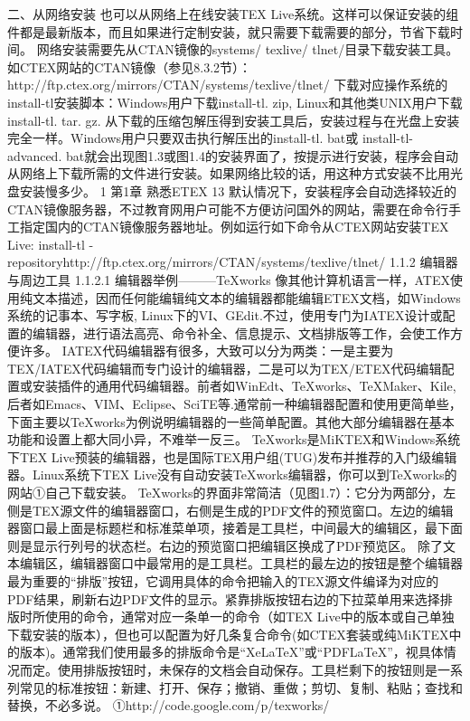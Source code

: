 \documentclass[UTF8]{ctexart}
\begin{document}
二、从网络安装
也可以从网络上在线安装TEX Live系统。这样可以保证安装的组件都是最新版本，而且如果进行定制安装，就只需要下载需要的部分，节省下载时间。
网络安装需要先从CTAN镜像的systems/ texlive/ tlnet/目录下载安装工具。如CTEX网站的CTAN镜像（参见8.3.2节）：
http://ftp.ctex.org/mirrors/CTAN/systems/texlive/tlnet/
下载对应操作系统的install-tl安装脚本：Windows用户下载install-tl. zip, Linux和其他类UNIX用户下载install-tl. tar. gz.
从下载的压缩包解压得到安装工具后，安装过程与在光盘上安装完全一样。Windows用户只要双击执行解压出的install-tl. bat或 install-tl-advanced. bat就会出现图1.3或图1.4的安装界面了，按提示进行安装，程序会自动从网络上下载所需的文件进行安装。如果网络比较的话，用这种方式安装不比用光盘安装慢多少。
1
第1章	熟悉ETEX	13
默认情况下，安装程序会自动选择较近的CTAN镜像服务器，不过教育网用户可能不方便访问国外的网站，需要在命令行手工指定国内的CTAN镜像服务器地址。例如运行如下命令从CTEX网站安装TEX Live:
install-tl -repositoryhttp://ftp.ctex.org/mirrors/CTAN/systems/texlive/tlnet/
1.1.2  编辑器与周边工具
1.1.2.1 编辑器举例———TeXworks
像其他计算机语言一样，ATEX使用纯文本描述，因而任何能编辑纯文本的编辑器都能编辑ETEX文档，如Windows系统的记事本、写字板, Linux下的VI、GEdit.不过，使用专门为IATEX设计或配置的编辑器，进行语法高亮、命令补全、信息提示、文档排版等工作，会使工作方便许多。
IATEX代码编辑器有很多，大致可以分为两类：一是主要为TEX/IATEX代码编辑而专门设计的编辑器，二是可以为TEX/ETEX代码编辑配置或安装插件的通用代码编辑器。前者如WinEdt、TeXworks、TeXMaker、Kile, 后者如Emacs、VIM、Eclipse、SciTE等.通常前一种编辑器配置和使用更简单些，下面主要以TeXworks为例说明编辑器的一些简单配置。其他大部分编辑器在基本功能和设置上都大同小异，不难举一反三。
TeXworks是MiKTEX和Windows系统下TEX Live预装的编辑器，也是国际TEX用户组(TUG)发布并推荐的入门级编辑器。Linux系统下TEX Live没有自动安装TeXworks编辑器，你可以到TeXworks的网站①自己下载安装。
TeXworks的界面非常简洁（见图1.7）：它分为两部分，左侧是TEX源文件的编辑器窗口，右侧是生成的PDF文件的预览窗口。左边的编辑器窗口最上面是标题栏和标准菜单项，接着是工具栏，中间最大的编辑区，最下面则是显示行列号的状态栏。右边的预览窗口把编辑区换成了PDF预览区。
除了文本编辑区，编辑器窗口中最常用的是工具栏。工具栏的最左边的按钮是整个编辑器最为重要的“排版”按钮，它调用具体的命令把输入的TEX源文件编译为对应的PDF结果，刷新右边PDF文件的显示。紧靠排版按钮右边的下拉菜单用来选择排版时所使用的命令，通常对应一条单一的命令（如TEX Live中的版本或自己单独下载安装的版本），但也可以配置为好几条复合命令(如CTEX套装或纯MiKTEX中的版本)。通常我们使用最多的排版命令是“XeLaTeX”或“PDFLaTeX”，视具体情况而定。使用排版按钮时，未保存的文档会自动保存。工具栏剩下的按钮则是一系列常见的标准按钮：新建、打开、保存；撤销、重做；剪切、复制、粘贴；查找和替换，不必多说。
①http://code.google.com/p/texworks/

%
\end{document}
